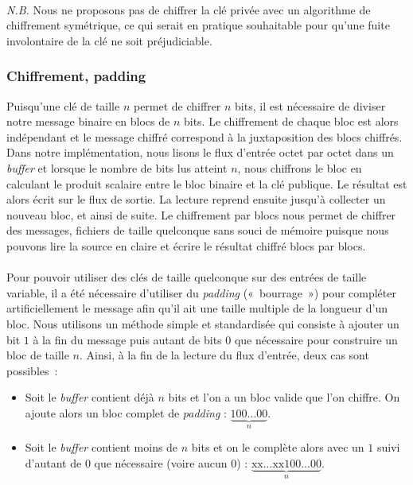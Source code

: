 \documentclass[a4paper,10pt]{article}
\begin{document}
\paragraph{} \textit{N.B.} Nous ne proposons pas de chiffrer la clé privée avec un algorithme de chiffrement symétrique, ce qui serait en pratique souhaitable pour qu'une fuite involontaire de la clé ne soit préjudiciable.

\subsubsection{Chiffrement, padding}

Puisqu'une clé de taille $n$ permet de chiffrer $n$ bits, il est nécessaire de diviser notre message binaire en blocs de $n$ bits. Le chiffrement de chaque bloc est alors indépendant et le message chiffré correspond à la juxtaposition des blocs chiffrés.
Dans notre implémentation, nous lisons le flux d'entrée octet par octet dans un \textit{buffer} et lorsque le nombre de bits lus atteint $n$, nous chiffrons le bloc en calculant le produit scalaire entre le bloc binaire et la clé publique. Le résultat est alors écrit sur le flux de sortie. La lecture reprend ensuite jusqu'à collecter un nouveau bloc, et ainsi de suite. Le chiffrement par blocs nous permet de chiffrer des messages, fichiers de taille quelconque sans souci de mémoire puisque nous pouvons lire la source en claire et écrire le résultat chiffré blocs par blocs.

\paragraph{} Pour pouvoir utiliser des clés de taille quelconque sur des entrées de taille variable, il a été nécessaire d'utiliser du \textit{padding} («~bourrage~») pour compléter artificiellement le message afin qu'il ait une taille multiple de la longueur d'un bloc. Nous utilisons un méthode simple et standardisée qui consiste à ajouter un bit $1$ à la fin du message puis autant de bits $0$ que nécessaire pour construire un bloc de taille $n$. Ainsi, à la fin de la lecture du flux d'entrée, deux cas sont possibles~:

\begin{itemize}
\item Soit le \textit{buffer} contient déjà $n$ bits et l'on a un bloc valide que l'on chiffre. On ajoute alors un bloc complet de \textit{padding} : $\underbrace{100...00}_{n}$.
\item Soit le \textit{buffer} contient moins de $n$ bits et on le complète alors avec un $1$ suivi d'autant de $0$ que nécessaire (voire aucun $0$) : $\underbrace{\text{xx...xx}100...00}_{n}$.
\end{itemize}
\end{document}
